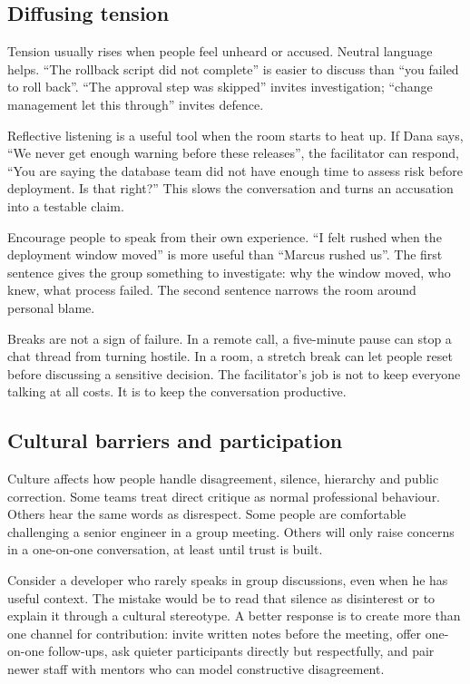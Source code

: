 \subsection{Diffusing tension}


Tension usually rises when people feel unheard or accused. Neutral language helps. ``The rollback script did not complete'' is easier to discuss than ``you failed to roll back''. ``The approval step was skipped'' invites investigation; ``change management let this through'' invites defence.


Reflective listening is a useful tool when the room starts to heat up. If Dana says, ``We never get enough warning before these releases'', the facilitator can respond, ``You are saying the database team did not have enough time to assess risk before deployment. Is that right?'' This slows the conversation and turns an accusation into a testable claim.


Encourage people to speak from their own experience. ``I felt rushed when the deployment window moved'' is more useful than ``Marcus rushed us''. The first sentence gives the group something to investigate: why the window moved, who knew, what process failed. The second sentence narrows the room around personal blame.


Breaks are not a sign of failure. In a remote call, a five-minute pause can stop a chat thread from turning hostile. In a room, a stretch break can let people reset before discussing a sensitive decision. The facilitator's job is not to keep everyone talking at all costs. It is to keep the conversation productive.



\subsection{Cultural barriers and participation}


Culture affects how people handle disagreement, silence, hierarchy and public correction. Some teams treat direct critique as normal professional behaviour. Others hear the same words as disrespect. Some people are comfortable challenging a senior engineer in a group meeting. Others will only raise concerns in a one-on-one conversation, at least until trust is built.


Consider a developer who rarely speaks in group discussions, even when he has useful context. The mistake would be to read that silence as disinterest or to explain it through a cultural stereotype. A better response is to create more than one channel for contribution: invite written notes before the meeting, offer one-on-one follow-ups, ask quieter participants directly but respectfully, and pair newer staff with mentors who can model constructive disagreement.


